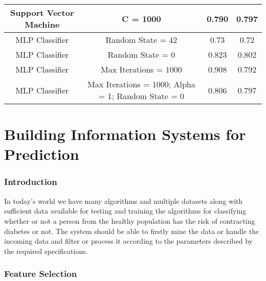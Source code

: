 \documentclass[12pt]{article}
\begin{document}
{\begin{landscape}
\begin{table}[]
\begin{tabular}{|c|c|c|c|}
Support Vector Machine & C = 1000                                           & 0.790              & 0.797             \\ \hline
MLP Classifier         & Random State = 42                                  & 0.73               & 0.72              \\ \hline
MLP Classifier         & Random State = 0                                   & 0.823              & 0.802             \\ \hline
MLP Classifier         & Max Iterations = 1000                              & 0.908              & 0.792             \\ \hline
MLP Classifier         & Max Iterations = 1000; Alpha = 1; Random State = 0 & 0.806              & 0.797             \\ \hline
\end{tabular}
\end{table}
    \end{landscape}
    \clearpage%
}



\newpage
\part{Building Information Systems for Prediction}
\section{Introduction}
In today's world we have many algorithms and multiple datasets along with sufficient data available for testing and training the algorithms for classifying whether or not a person from the healthy population has the risk of contracting diabetes or not. The system should be able to firstly mine the data or handle the incoming data and filter or process it according to the parameters described by the required specifications.


\section{Feature Selection}
\newpage
\end{document}
